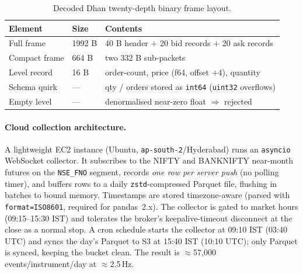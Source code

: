 \documentclass[11pt]{article}
\begin{document}
\begin{table}[h]
\centering
\caption{Decoded Dhan twenty-depth binary frame layout.}
\label{tab:packet}
\begin{tabular}{@{}lll@{}}
\toprule
Element & Size & Contents \\
\midrule
Full frame      & 1992 B & 40 B header $+$ 20 bid records $+$ 20 ask records \\
Compact frame   & 664 B  & two 332 B sub-packets \\
Level record    & 16 B   & order-count, price (f64, offset $+4$), quantity \\
Schema quirk    & ---    & qty / orders stored as \texttt{int64} (\texttt{uint32} overflows) \\
Empty level     & ---    & denormalised near-zero float $\Rightarrow$ rejected \\
\bottomrule
\end{tabular}
\end{table}

\paragraph{Cloud collection architecture.}
A lightweight EC2 instance (Ubuntu, \texttt{ap-south-2}/Hyderabad) runs an \texttt{asyncio} WebSocket
collector. It subscribes to the NIFTY and BANKNIFTY near-month futures on the \texttt{NSE\_FNO} segment,
records \emph{one row per server push} (no polling timer), and buffers rows to a daily \texttt{zstd}-compressed
Parquet file, flushing in batches to bound memory. Timestamps are stored timezone-aware (parsed with
\texttt{format=\textquotesingle ISO8601\textquotesingle}, required for pandas~2.x). The collector is gated to
market hours (09:15--15:30 IST) and tolerates the broker's keepalive-timeout disconnect at the close as a
normal stop. A cron schedule starts the collector at 09:10 IST (03:40 UTC) and syncs the day's Parquet to S3
at 15:40 IST (10:10 UTC); only Parquet is synced, keeping the bucket clean. The result is
$\approx$57{,}000 events/instrument/day at $\approx$2.5\,Hz.
\end{document}
